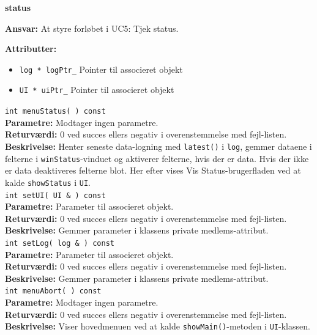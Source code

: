 {\centering
\textbf{status}\par
}
\textbf{Ansvar:} At styre forløbet i UC5: Tjek status. \

\textbf{Attributter:}
\begin{itemize}
	\item \verb+log * logPtr_+ Pointer til associeret objekt
	\item \verb+UI * uiPtr_+ Pointer til associeret objekt
\end{itemize}

\verb+int menuStatus( ) const+ \\
\textbf{Parametre:} Modtager ingen parametre. \\
\textbf{Returværdi:} 0 ved succes ellers negativ i overenstemmelse med fejl-listen. \\
\textbf{Beskrivelse:} Henter seneste data-logning med \verb+latest()+ i \verb+log+, gemmer dataene i felterne i \verb+winStatus+-vinduet og aktiverer felterne, hvis der er data. Hvis der ikke er data deaktiveres felterne blot. Her efter vises Vis Status-brugerfladen ved at kalde \verb+showStatus+ i \verb+UI+.\\

\verb+int setUI( UI & ) const+ \\
\textbf{Parametre:} Parameter til associeret objekt. \\
\textbf{Returværdi:} 0 ved succes ellers negativ i overenstemmelse med fejl-listen. \\
\textbf{Beskrivelse:} Gemmer parameter i klassens private medlems-attribut. \\

\verb+int setLog( log & ) const+ \\
\textbf{Parametre:} Parameter til associeret objekt. \\
\textbf{Returværdi:} 0 ved succes ellers negativ i overenstemmelse med fejl-listen. \\
\textbf{Beskrivelse:} Gemmer parameter i klassens private medlems-attribut. \\

\verb+int menuAbort( ) const+ \\
\textbf{Parametre:} Modtager ingen parametre. \\
\textbf{Returværdi:} 0 ved succes ellers negativ i overenstemmelse med fejl-listen. \\
\textbf{Beskrivelse:} Viser hovedmenuen ved at kalde \verb+showMain()+-metoden i \verb+UI+-klassen.\\

